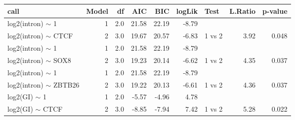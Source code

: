 \begin{table}[ht]
\centering
\begin{tabular}{lrrrrrlrr}
  \hline
call & Model & df & AIC & BIC & logLik & Test & L.Ratio & p-value \\ 
  \hline
log2(intron) $\sim$ 1 &  1 & 2.0 & 21.58 & 22.19 & -8.79 &  &  &  \\ 
  log2(intron) $\sim$ CTCF &  2 & 3.0 & 19.67 & 20.57 & -6.83 & 1 vs 2 & 3.92 & 0.048 \\ 
   \hline
log2(intron) $\sim$ 1 &  1 & 2.0 & 21.58 & 22.19 & -8.79 &  &  &  \\ 
  log2(intron) $\sim$ SOX8 &  2 & 3.0 & 19.23 & 20.14 & -6.62 & 1 vs 2 & 4.35 & 0.037 \\ 
   \hline
log2(intron) $\sim$ 1 &  1 & 2.0 & 21.58 & 22.19 & -8.79 &  &  &  \\ 
  log2(intron) $\sim$ ZBTB26 &  2 & 3.0 & 19.22 & 20.13 & -6.61 & 1 vs 2 & 4.36 & 0.037 \\ 
   \hline
log2(GI) $\sim$ 1 &  1 & 2.0 & -5.57 & -4.96 & 4.78 &  &  &  \\ 
  log2(GI) $\sim$ CTCF &  2 & 3.0 & -8.85 & -7.94 & 7.42 & 1 vs 2 & 5.28 & 0.022 \\ 
   \hline
\end{tabular}
\end{table}
